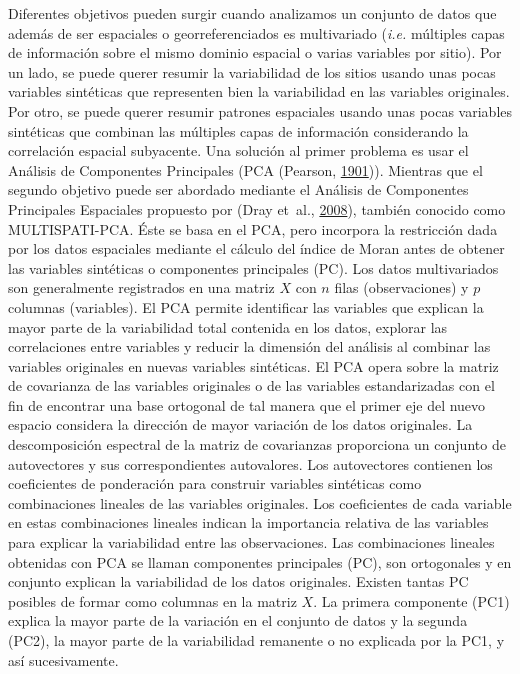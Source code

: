 \documentclass[11pt,b5paper,]{krantz}
\begin{document}
Diferentes objetivos pueden surgir cuando analizamos un conjunto de datos que además de ser espaciales o georreferenciados es multivariado (\emph{i.e.} múltiples capas de información sobre el mismo dominio espacial o varias variables por sitio). Por un lado, se puede querer resumir la variabilidad de los sitios usando unas pocas variables sintéticas que representen bien la variabilidad en las variables originales. Por otro, se puede querer resumir patrones espaciales usando unas pocas variables sintéticas que combinan las múltiples capas de información considerando la correlación espacial subyacente. Una solución al primer problema es usar el Análisis de Componentes Principales (PCA (Pearson, \protect\hyperlink{ref-F.R.S._1901}{1901})). Mientras que el segundo objetivo puede ser abordado mediante el Análisis de Componentes Principales Espaciales propuesto por (Dray et~al., \protect\hyperlink{ref-Dray_Sauxefd_Duxe9bias_2008}{2008}), también conocido como MULTISPATI-PCA. Éste se basa en el PCA, pero incorpora la restricción dada por los datos espaciales mediante el cálculo del índice de Moran antes de obtener las variables sintéticas o componentes principales (PC).
Los datos multivariados son generalmente registrados en una matriz \(X\) con \(n\) filas (observaciones) y \(p\) columnas (variables). El PCA permite identificar las variables que explican la mayor parte de la variabilidad total contenida en los datos, explorar las correlaciones entre variables y reducir la dimensión del análisis al combinar las variables originales en nuevas variables sintéticas. El PCA opera sobre la matriz de covarianza de las variables originales o de las variables estandarizadas con el fin de encontrar una base ortogonal de tal manera que el primer eje del nuevo espacio considera la dirección de mayor variación de los datos originales. La descomposición espectral de la matriz de covarianzas proporciona un conjunto de autovectores y sus correspondientes autovalores. Los autovectores contienen los coeficientes de ponderación para construir variables sintéticas como combinaciones lineales de las variables originales. Los coeficientes de cada variable en estas combinaciones lineales indican la importancia relativa de las variables para explicar la variabilidad entre las observaciones. Las combinaciones lineales obtenidas con PCA se llaman componentes principales (PC), son ortogonales y en conjunto explican la variabilidad de los datos originales. Existen tantas PC posibles de formar como columnas en la matriz \(X\). La primera componente (PC1) explica la mayor parte de la variación en el conjunto de datos y la segunda (PC2), la mayor parte de la variabilidad remanente o no explicada por la PC1, y así sucesivamente.
\end{document}
